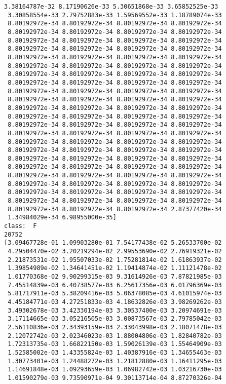 \documentclass[11pt]{article}
\begin{document}
\begin{Verbatim}[commandchars=\\\{\}]
 3.38164787e-32 8.17190626e-33 5.30651868e-33 3.65852525e-33
 3.30858554e-33 2.79752883e-33 1.59569552e-33 1.18789074e-33
 8.80192972e-34 8.80192972e-34 8.80192972e-34 8.80192972e-34
 8.80192972e-34 8.80192972e-34 8.80192972e-34 8.80192972e-34
 8.80192972e-34 8.80192972e-34 8.80192972e-34 8.80192972e-34
 8.80192972e-34 8.80192972e-34 8.80192972e-34 8.80192972e-34
 8.80192972e-34 8.80192972e-34 8.80192972e-34 8.80192972e-34
 8.80192972e-34 8.80192972e-34 8.80192972e-34 8.80192972e-34
 8.80192972e-34 8.80192972e-34 8.80192972e-34 8.80192972e-34
 8.80192972e-34 8.80192972e-34 8.80192972e-34 8.80192972e-34
 8.80192972e-34 8.80192972e-34 8.80192972e-34 8.80192972e-34
 8.80192972e-34 8.80192972e-34 8.80192972e-34 8.80192972e-34
 8.80192972e-34 8.80192972e-34 8.80192972e-34 8.80192972e-34
 8.80192972e-34 8.80192972e-34 8.80192972e-34 8.80192972e-34
 8.80192972e-34 8.80192972e-34 8.80192972e-34 8.80192972e-34
 8.80192972e-34 8.80192972e-34 8.80192972e-34 8.80192972e-34
 8.80192972e-34 8.80192972e-34 8.80192972e-34 8.80192972e-34
 8.80192972e-34 8.80192972e-34 8.80192972e-34 8.80192972e-34
 8.80192972e-34 8.80192972e-34 8.80192972e-34 8.80192972e-34
 8.80192972e-34 8.80192972e-34 8.80192972e-34 8.80192972e-34
 8.80192972e-34 8.80192972e-34 8.80192972e-34 8.80192972e-34
 8.80192972e-34 8.80192972e-34 8.80192972e-34 8.80192972e-34
 8.80192972e-34 8.80192972e-34 8.80192972e-34 8.80192972e-34
 8.80192972e-34 8.80192972e-34 8.80192972e-34 8.80192972e-34
 8.80192972e-34 8.80192972e-34 8.80192972e-34 2.87377420e-34
 1.34984029e-34 6.98955000e-35]
class:  F
20752
[3.09467728e-01 1.09903280e-01 7.54177438e-02 5.26533700e-02
 4.29504470e-02 3.20219294e-02 2.99553690e-02 2.76919321e-02
 2.21873531e-02 1.95507033e-02 1.75281814e-02 1.61863937e-02
 1.39854989e-02 1.34641451e-02 1.19414874e-02 1.11121478e-02
 1.01770368e-02 9.90299315e-03 9.31614926e-03 7.87821985e-03
 7.45514839e-03 6.40738577e-03 6.25617356e-03 6.01796369e-03
 5.81717911e-03 5.38209416e-03 5.06378085e-03 4.61015974e-03
 4.45184771e-03 4.27251833e-03 4.18632826e-03 3.98269262e-03
 3.49302678e-03 3.42330194e-03 3.30537400e-03 3.20974691e-03
 3.17114665e-03 3.05216505e-03 3.00873567e-03 2.79785042e-03
 2.56110836e-03 2.34393159e-03 2.33043998e-03 2.18071478e-03
 2.12072742e-03 2.02346023e-03 1.88004806e-03 1.82840782e-03
 1.72313735e-03 1.66822150e-03 1.59026139e-03 1.55464909e-03
 1.52585002e-03 1.43355824e-03 1.40387916e-03 1.34655463e-03
 1.30773401e-03 1.24488272e-03 1.21812880e-03 1.16411295e-03
 1.14691848e-03 1.09293659e-03 1.06982742e-03 1.03216730e-03
 1.01590279e-03 9.73590971e-04 9.30113714e-04 8.87270326e-04

\end{Verbatim}
\end{document}
